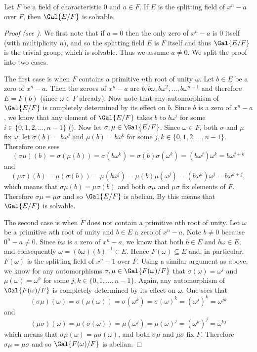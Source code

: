 \begin{theorem}\label{thrm-galois-group-of-polynomial-of-nth-root-of-a-is-solvable}
    Let $F$ be a field of characteristic 0 and $a \in F$. If $E$ is the splitting field of $x^n - a$ over $F$, then $\Gal{E/F}$ is solvable.
\end{theorem}
\begin{proof}[Proof (see {\cite[Theorem 32.2]{gallian_2016}})]
    We first note that if $a = 0$ then the only zero of $x^n - a$ is 0 itself (with multiplicity $n$), and so the splitting field $E$ is $F$ itself and thus $\Gal{E/F}$ is the trivial group, which is solvable. Thus we assume $a \neq 0$. We split the proof into two cases.

    The first case is when $F$ contains a primitive $n$th root of unity $\omega$. Let $b \in E$ be a zero of $x^n - a$. Then the zeroes of $x^n - a$ are $b, b\omega, b\omega^2, \dots, b\omega^{n-1}$ and therefore $E = F(b)$ (since $\omega \in F$ already). Now note that any automorphism of $\Gal{E/F}$ is completely determined by its effect on $b$. Since $b$ is a zero of $x^n - a$, we know that any element of $\Gal{E/F}$ takes $b$ to $b\omega^i$ for some $i \in \{0, 1, 2, \dots, n - 1\}$ (). Now let $\sigma, \mu \in \Gal{E/F}$. Since $\omega \in F$, both $\sigma$ and $\mu$ fix $\omega$; let $\sigma(b) = b\omega^j$ and $\mu(b) = b\omega^k$ for some $j, k \in \{0, 1, 2, \dots, n - 1\}$. Therefore one sees
    \[
        (\sigma\mu)(b) = \sigma(\mu(b)) = \sigma(b\omega^k) = \sigma(b)\sigma(\omega^k) = (b\omega^j)\omega^k = b\omega^{j+k}
    \]
    and
    \[
        (\mu\sigma)(b) = \mu(\sigma(b)) = \mu(b\omega^j) = \mu(b)\mu(\omega^j) = (b\omega^k)\omega^j = b\omega^{k+j},
    \]
    which means that $\sigma\mu(b) = \mu\sigma(b)$ and both $\sigma\mu$ and $\mu\sigma$ fix elements of $F$. Therefore $\sigma\mu = \mu\sigma$ and so $\Gal{E/F}$ is abelian. By  this means that $\Gal{E/F}$ is solvable.

    The second case is when $F$ does not contain a primitive $n$th root of unity. Let $\omega$ be a primitive $n$th root of unity and $b \in E$ a zero of $x^n - a$. Note $b \neq 0$ because $0^n-a \neq 0$. Since $b\omega$ is a zero of $x^n - a$, we know that both $b \in E$ and $b\omega \in E$, and consequently $\omega = (b\omega)(b)^{-1} \in E$. Hence $F(\omega) \subseteq E$ and, in particular, $F(\omega)$ is the splitting field of $x^n - 1$ over $F$. Using a similar argument as above, we know for any automorphisms $\sigma, \mu \in \Gal{F(\omega)/F}$ that $\sigma(\omega) = \omega^j$ and $\mu(\omega) = \omega^k$ for some $j, k \in \{0, 1, \dots, n - 1\}$. Again, any automorphism of $\Gal{F(\omega)/F}$ is completely determined by its effect on $\omega$. One sees that
    \[
        (\sigma\mu)(\omega) = \sigma(\mu(\omega)) = \sigma(\omega^k) = \sigma(\omega)^k = (\omega^j)^k = \omega^{jk}
    \]
    and
    \[
        (\mu\sigma)(\omega) = \mu(\sigma(\omega)) = \mu(\omega^j) = \mu(\omega)^j = (\omega^k)^j = \omega^{kj}
    \]
    which means that $\sigma\mu(\omega) = \mu\sigma(\omega)$, and both $\sigma\mu$ and $\mu\sigma$ fix $F$. Therefore $\sigma\mu = \mu\sigma$ and so $\Gal{F(\omega)/F}$ is abelian.


\end{proof}
